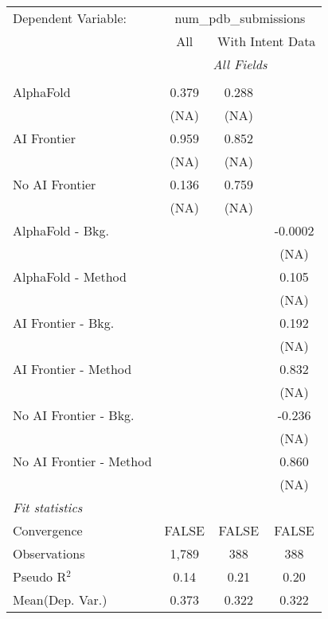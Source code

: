 \begingroup
\centering
\begin{tabular}{lccc}
   \tabularnewline \midrule \midrule
   Dependent Variable: & \multicolumn{3}{c}{num\_pdb\_submissions}\\
 & \multicolumn{1}{c}{All} & \multicolumn{2}{c}{With Intent Data} \\
\cmidrule(lr){2-2} \cmidrule(lr){3-4}
 & \multicolumn{3}{c}{\textit{All Fields}} \\ \\
   AlphaFold               & 0.379 & 0.288 &   \\   
                           & (NA)  & (NA)  &   \\   
   AI Frontier             & 0.959 & 0.852 &   \\   
                           & (NA)  & (NA)  &   \\   
   No AI Frontier          & 0.136 & 0.759 &   \\   
                           & (NA)  & (NA)  &   \\   
   AlphaFold - Bkg.        &       &       & -0.0002\\   
                           &       &       & (NA)\\   
   AlphaFold - Method      &       &       & 0.105\\   
                           &       &       & (NA)\\   
   AI Frontier - Bkg.      &       &       & 0.192\\   
                           &       &       & (NA)\\   
   AI Frontier - Method    &       &       & 0.832\\   
                           &       &       & (NA)\\   
   No AI Frontier - Bkg.   &       &       & -0.236\\   
                           &       &       & (NA)\\   
   No AI Frontier - Method &       &       & 0.860\\   
                           &       &       & (NA)\\   
   \midrule
   \emph{Fit statistics}\\
   Convergence             &FALSE  & FALSE & FALSE\\  
   Observations            & 1,789 & 388   & 388\\  
   Pseudo R$^2$            & 0.14  & 0.21  & 0.20\\  
Mean(Dep. Var.) & 0.373 & 0.322 & 0.322 \\
   

\end{tabular}
